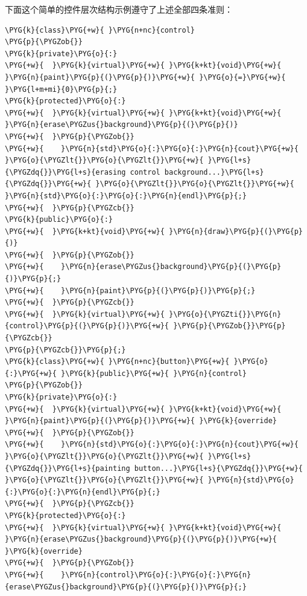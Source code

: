 下面这个简单的控件层次结构示例遵守了上述全部四条准则：



\begin{codeblockbg}
\begin{Verbatim}[commandchars=\\\{\},breaklines=true,breakanywhere=true,fontsize=\codefont,xleftmargin=17bp]
\PYG{k}{class}\PYG{+w}{ }\PYG{n+nc}{control}
\PYG{p}{\PYGZob{}}
\PYG{k}{private}\PYG{o}{:}
\PYG{+w}{  }\PYG{k}{virtual}\PYG{+w}{ }\PYG{k+kt}{void}\PYG{+w}{ }\PYG{n}{paint}\PYG{p}{(}\PYG{p}{)}\PYG{+w}{ }\PYG{o}{=}\PYG{+w}{ }\PYG{l+m+mi}{0}\PYG{p}{;}
\PYG{k}{protected}\PYG{o}{:}
\PYG{+w}{  }\PYG{k}{virtual}\PYG{+w}{ }\PYG{k+kt}{void}\PYG{+w}{ }\PYG{n}{erase\PYGZus{}background}\PYG{p}{(}\PYG{p}{)}
\PYG{+w}{  }\PYG{p}{\PYGZob{}}
\PYG{+w}{    }\PYG{n}{std}\PYG{o}{:}\PYG{o}{:}\PYG{n}{cout}\PYG{+w}{ }\PYG{o}{\PYGZlt{}}\PYG{o}{\PYGZlt{}}\PYG{+w}{ }\PYG{l+s}{\PYGZdq{}}\PYG{l+s}{erasing control background...}\PYG{l+s}{\PYGZdq{}}\PYG{+w}{ }\PYG{o}{\PYGZlt{}}\PYG{o}{\PYGZlt{}}\PYG{+w}{ }\PYG{n}{std}\PYG{o}{:}\PYG{o}{:}\PYG{n}{endl}\PYG{p}{;}
\PYG{+w}{  }\PYG{p}{\PYGZcb{}}
\PYG{k}{public}\PYG{o}{:}
\PYG{+w}{  }\PYG{k+kt}{void}\PYG{+w}{ }\PYG{n}{draw}\PYG{p}{(}\PYG{p}{)}
\PYG{+w}{  }\PYG{p}{\PYGZob{}}
\PYG{+w}{    }\PYG{n}{erase\PYGZus{}background}\PYG{p}{(}\PYG{p}{)}\PYG{p}{;}
\PYG{+w}{    }\PYG{n}{paint}\PYG{p}{(}\PYG{p}{)}\PYG{p}{;}
\PYG{+w}{  }\PYG{p}{\PYGZcb{}}
\PYG{+w}{  }\PYG{k}{virtual}\PYG{+w}{ }\PYG{o}{\PYGZti{}}\PYG{n}{control}\PYG{p}{(}\PYG{p}{)}\PYG{+w}{ }\PYG{p}{\PYGZob{}}\PYG{p}{\PYGZcb{}}
\PYG{p}{\PYGZcb{}}\PYG{p}{;}
\PYG{k}{class}\PYG{+w}{ }\PYG{n+nc}{button}\PYG{+w}{ }\PYG{o}{:}\PYG{+w}{ }\PYG{k}{public}\PYG{+w}{ }\PYG{n}{control}
\PYG{p}{\PYGZob{}}
\PYG{k}{private}\PYG{o}{:}
\PYG{+w}{  }\PYG{k}{virtual}\PYG{+w}{ }\PYG{k+kt}{void}\PYG{+w}{ }\PYG{n}{paint}\PYG{p}{(}\PYG{p}{)}\PYG{+w}{ }\PYG{k}{override}
\PYG{+w}{  }\PYG{p}{\PYGZob{}}
\PYG{+w}{    }\PYG{n}{std}\PYG{o}{:}\PYG{o}{:}\PYG{n}{cout}\PYG{+w}{ }\PYG{o}{\PYGZlt{}}\PYG{o}{\PYGZlt{}}\PYG{+w}{ }\PYG{l+s}{\PYGZdq{}}\PYG{l+s}{painting button...}\PYG{l+s}{\PYGZdq{}}\PYG{+w}{ }\PYG{o}{\PYGZlt{}}\PYG{o}{\PYGZlt{}}\PYG{+w}{ }\PYG{n}{std}\PYG{o}{:}\PYG{o}{:}\PYG{n}{endl}\PYG{p}{;}
\PYG{+w}{  }\PYG{p}{\PYGZcb{}}
\PYG{k}{protected}\PYG{o}{:}
\PYG{+w}{  }\PYG{k}{virtual}\PYG{+w}{ }\PYG{k+kt}{void}\PYG{+w}{ }\PYG{n}{erase\PYGZus{}background}\PYG{p}{(}\PYG{p}{)}\PYG{+w}{ }\PYG{k}{override}
\PYG{+w}{  }\PYG{p}{\PYGZob{}}
\PYG{+w}{    }\PYG{n}{control}\PYG{o}{:}\PYG{o}{:}\PYG{n}{erase\PYGZus{}background}\PYG{p}{(}\PYG{p}{)}\PYG{p}{;}

\end{Verbatim}
\end{codeblockbg}
